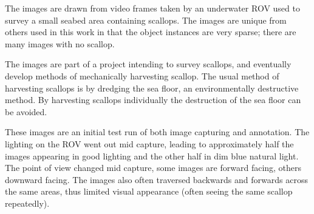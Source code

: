 \begin{itemize}
The images are drawn from video frames taken by an underwater \gls{ROV} used to survey a small seabed area containing scallops. The images are unique from others used in this work in that the object instances are very sparse; there are many images with no scallop. 

The images are part of a project intending to survey scallops, and eventually develop methods of mechanically harvesting scallop. The usual method of harvesting scallops is by dredging the sea floor, an environmentally destructive method. By harvesting scallops individually the destruction of the sea floor can be avoided.

These images are an initial test run of both image capturing and annotation. The lighting on the \gls{ROV} went out mid capture, leading to approximately half the images appearing in good lighting and the other half in dim blue natural light. The point of view changed mid capture, some images are forward facing, others downward facing. The images also often traversed backwards and forwards across the same areas, thus limited visual appearance (often seeing the same scallop repeatedly). 

\end{itemize}



